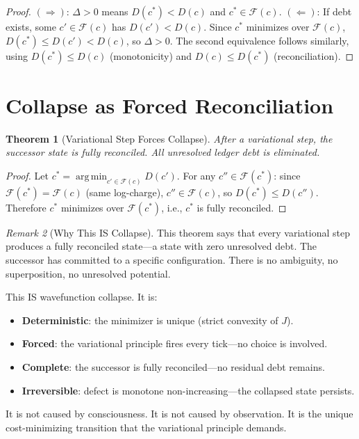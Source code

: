 \documentclass[11pt,a4paper]{article}
\theoremstyle{plain}
\newtheorem{theorem}{Theorem}[section]
\theoremstyle{definition}
\theoremstyle{remark}
\newtheorem{remark}[theorem]{Remark}
\newcommand{\Jcost}{J}
\newcommand{\F}{\mathcal{F}}
\begin{document}
\begin{proof}
$(\Rightarrow)$: $\Delta > 0$ means $D(c^*) < D(c)$ and $c^* \in \F(c)$.
$(\Leftarrow)$: If debt exists, some $c' \in \F(c)$ has $D(c') < D(c)$.
Since $c^*$ minimizes over $\F(c)$, $D(c^*) \le D(c') < D(c)$, so $\Delta > 0$.
The second equivalence follows similarly, using $D(c^*) \le D(c)$ (monotonicity) and $D(c) \le D(c^*)$ (reconciliation).
\end{proof}

\section{Collapse as Forced Reconciliation}\label{sec:collapse}

\begin{theorem}[Variational Step Forces Collapse]\label{thm:collapse}
After a variational step, the successor state is fully reconciled.
All unresolved ledger debt is eliminated.
\end{theorem}

\begin{proof}
Let $c^* = \operatorname*{arg\,min}_{c' \in \F(c)} D(c')$.
For any $c'' \in \F(c^*)$: since $\F(c^*) = \F(c)$ (same log-charge), $c'' \in \F(c)$, so $D(c^*) \le D(c'')$.
Therefore $c^*$ minimizes over $\F(c^*)$, i.e., $c^*$ is fully reconciled.
\end{proof}

\begin{remark}[Why This IS Collapse]
This theorem says that every variational step produces a fully reconciled state---a state with zero unresolved debt.
The successor has committed to a specific configuration.
There is no ambiguity, no superposition, no unresolved potential.

This IS wavefunction collapse.
It is:
\begin{itemize}[nosep]
\item \textbf{Deterministic}: the minimizer is unique (strict convexity of $\Jcost$).
\item \textbf{Forced}: the variational principle fires every tick---no choice is involved.
\item \textbf{Complete}: the successor is fully reconciled---no residual debt remains.
\item \textbf{Irreversible}: defect is monotone non-increasing---the collapsed state persists.
\end{itemize}
It is not caused by consciousness.
It is not caused by observation.
It is the unique cost-minimizing transition that the variational principle demands.
\end{remark}
\end{document}
